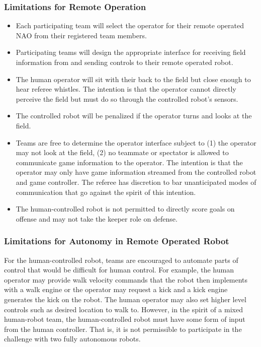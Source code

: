 \subsubsection{Limitations for Remote Operation}
\begin{itemize}
	\item Each participating team will select the operator for their remote operated NAO from their registered team members.
	\item Participating teams will design the appropriate interface for receiving field information from and sending controls to their remote operated robot.
	\item The human operator will sit with their back to the field but close enough to hear referee whistles. The intention is that the operator cannot directly perceive the field but must do so through the controlled robot’s sensors.
	\item The controlled robot will be penalized if the operator turns and looks at the field.
	\item Teams are free to determine the operator interface subject to (1) the operator may not look at the field, (2) no teammate or spectator  is allowed to communicate game information to the operator. The intention is that the operator may only have game information streamed from the controlled robot and game controller. The referee has discretion to bar unanticipated modes of communication that go against the spirit of this intention. 
	\item The human-controlled robot is not permitted to directly score goals on offense and may not take the keeper role on defense.
\end{itemize}

\subsubsection{Limitations for Autonomy in Remote Operated Robot}

For the human-controlled robot, teams are encouraged to automate parts of control that would be difficult for human control. For example, the human operator may provide walk velocity commands that the robot then implements with a walk engine or the operator may request a kick and a kick engine generates the kick on the robot. The human operator may also set higher level controls such as desired location to walk to. However, in the spirit of a mixed human-robot team, the human-controlled robot must have some form of input from the human controller. That is, it is not permissible to participate in the challenge with two fully autonomous robots.

